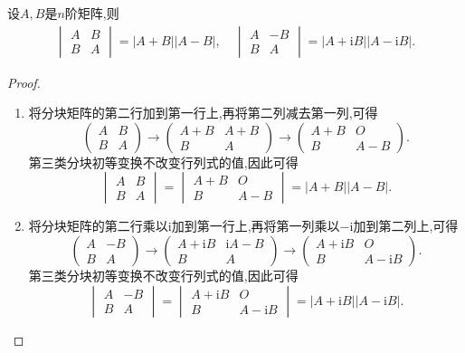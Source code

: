 \documentclass[../../main.tex]{subfiles}%
\begin{document}
\begin{proposition}\label{proposition:对角相同分块矩阵行列式计算}
设\(A,B\)是\(n\)阶矩阵,则
\begin{gather*}
\begin{vmatrix}
A & B\\
B & A
\end{vmatrix}=|A + B||A - B|,
\quad 
\begin{vmatrix}
A & -B\\
B & A
\end{vmatrix}=|A + \mathrm{i}B||A - \mathrm{i}B|.
\end{gather*}
\end{proposition}
\begin{proof}
\begin{enumerate}[(1)]
\item 将分块矩阵的第二行加到第一行上,再将第二列减去第一列,可得
\[
\begin{pmatrix}
A & B\\
B & A
\end{pmatrix}\to\begin{pmatrix}
A + B & A + B\\
B & A
\end{pmatrix}\to\begin{pmatrix}
A + B & O\\
B & A - B
\end{pmatrix}.
\]
第三类分块初等变换不改变行列式的值,因此可得
\[
\begin{vmatrix}
A & B\\
B & A
\end{vmatrix}=\begin{vmatrix}
A + B & O\\
B & A - B
\end{vmatrix}=|A + B||A - B|.
\]

\item 将分块矩阵的第二行乘以\(\mathrm{i}\)加到第一行上,再将第一列乘以\(-\mathrm{i}\)加到第二列上,可得
\[
\begin{pmatrix}
A & -B\\
B & A
\end{pmatrix}\to\begin{pmatrix}
A + \mathrm{i}B & \mathrm{i}A - B\\
B & A
\end{pmatrix}\to\begin{pmatrix}
A + \mathrm{i}B & O\\
B & A - \mathrm{i}B
\end{pmatrix}.
\]
第三类分块初等变换不改变行列式的值,因此可得
\[
\begin{vmatrix}
A & -B\\
B & A
\end{vmatrix}=\begin{vmatrix}
A + \mathrm{i}B & O\\
B & A - \mathrm{i}B
\end{vmatrix}=|A + \mathrm{i}B||A - \mathrm{i}B|.
\]
\end{enumerate}
\end{proof}
\end{document}
